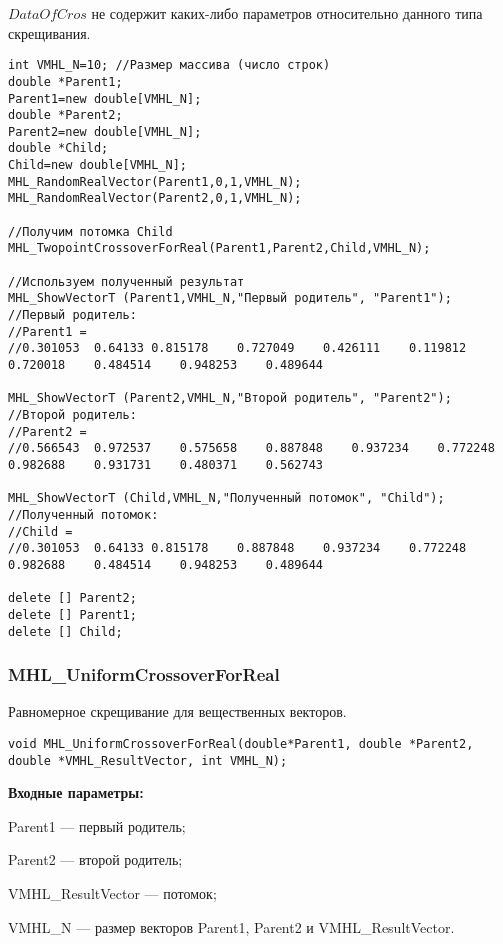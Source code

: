 \documentclass[a4paper,12pt]{article}
\begin{document}
$ DataOfCros $ не содержит каких-либо параметров относительно данного типа скрещивания.


\begin{lstlisting}[label=code_use_MHL_TwopointCrossoverForReal,caption=Пример использования]
int VMHL_N=10; //Размер массива (число строк)
double *Parent1;
Parent1=new double[VMHL_N];
double *Parent2;
Parent2=new double[VMHL_N];
double *Child;
Child=new double[VMHL_N];
MHL_RandomRealVector(Parent1,0,1,VMHL_N);
MHL_RandomRealVector(Parent2,0,1,VMHL_N);

//Получим потомка Child
MHL_TwopointCrossoverForReal(Parent1,Parent2,Child,VMHL_N);

//Используем полученный результат
MHL_ShowVectorT (Parent1,VMHL_N,"Первый родитель", "Parent1");
//Первый родитель:
//Parent1 =	
//0.301053	0.64133	0.815178	0.727049	0.426111	0.119812	0.720018	0.484514	0.948253	0.489644

MHL_ShowVectorT (Parent2,VMHL_N,"Второй родитель", "Parent2");
//Второй родитель:
//Parent2 =	
//0.566543	0.972537	0.575658	0.887848	0.937234	0.772248	0.982688	0.931731	0.480371	0.562743

MHL_ShowVectorT (Child,VMHL_N,"Полученный потомок", "Child");
//Полученный потомок:
//Child =	
//0.301053	0.64133	0.815178	0.887848	0.937234	0.772248	0.982688	0.484514	0.948253	0.489644

delete [] Parent2;
delete [] Parent1;
delete [] Child;
\end{lstlisting}

\subsubsection{MHL\_UniformCrossoverForReal}\label{MHL_UniformCrossoverForReal}

Равномерное скрещивание для вещественных векторов.


\begin{lstlisting}[label=code_syntax_MHL_UniformCrossoverForReal,caption=Синтаксис]
void MHL_UniformCrossoverForReal(double*Parent1, double *Parent2, double *VMHL_ResultVector, int VMHL_N);
\end{lstlisting}

\textbf{Входные параметры:}
 
 Parent1 --- первый родитель;
 
 Parent2 --- второй родитель;
 
 VMHL\_ResultVector --- потомок;
 
 VMHL\_N --- размер векторов Parent1, Parent2 и VMHL\_ResultVector.
\end{document}
